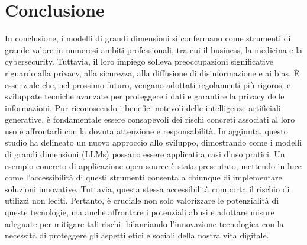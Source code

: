 \chapter*{Conclusione} %
In conclusione, i modelli di grandi dimensioni si confermano come strumenti di grande valore in numerosi ambiti professionali, tra cui il business, la medicina e la cybersecurity. Tuttavia, il loro impiego solleva preoccupazioni significative riguardo alla privacy, alla sicurezza, alla diffusione di disinformazione e ai bias. È essenziale che, nel prossimo futuro, vengano adottati regolamenti più rigorosi e sviluppate tecniche avanzate per proteggere i dati e garantire la privacy delle informazioni. Pur riconoscendo i benefici notevoli delle intelligenze artificiali generative, è fondamentale essere consapevoli dei rischi concreti associati al loro uso e affrontarli con la dovuta attenzione e responsabilità.
In aggiunta, questo studio ha delineato un nuovo approccio allo sviluppo, dimostrando come i modelli di grandi dimensioni (LLMs) possano essere applicati a casi d'uso pratici. Un esempio concreto di applicazione open-source è stato presentato, mettendo in luce come l’accessibilità di questi strumenti consenta a chiunque di implementare soluzioni innovative. Tuttavia, questa stessa accessibilità comporta il rischio di utilizzi non leciti. Pertanto, è cruciale non solo valorizzare le potenzialità di queste tecnologie, ma anche affrontare i potenziali abusi e adottare misure adeguate per mitigare tali rischi, bilanciando l'innovazione tecnologica con la necessità di proteggere gli aspetti etici e sociali della nostra vita digitale.
